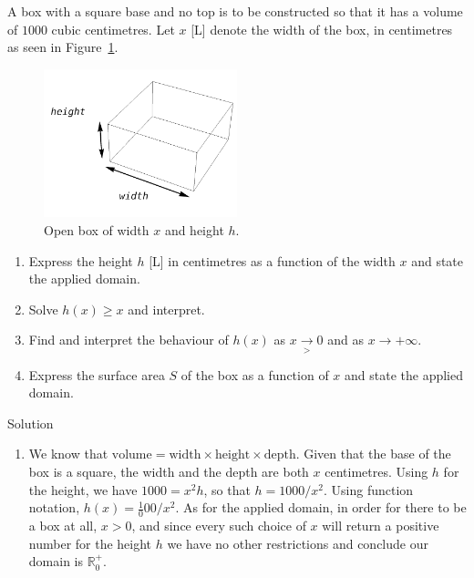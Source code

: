 \begin{example}  \label{boxnotopfixedvolume} 
A box with a square base and no top is to be constructed so that it has a volume of $1000$ cubic centimetres.  Let $x$ [L] denote the width of the box, in centimetres as seen in Figure~\ref{fig_algebraic_11}.

\begin{figure}[H]
	\begin{center}
			\includegraphics[width=0.5\textwidth]{fig_algebraic_11}
	\caption{Open box of width $x$ and height $h$.}
	\label{fig_algebraic_11}
	\end{center}
\end{figure}


\begin{enumerate}

\item  Express the height $h$ [L] in centimetres as a function of the width $x$ and state the applied domain.

\item  Solve $h(x) \geq x$ and interpret.

\item  Find and interpret the behaviour of $h(x)$ as $x \underset{>}{\rightarrow} 0$ and as $x \rightarrow +\infty$.

\item  Express the surface area $S$ of the box as a function of $x$ and state the applied domain.


\end{enumerate}

Solution 

\begin{enumerate}

\item  We know that $\mbox{volume} = \mbox{width} \times \mbox{height} \times \mbox{depth}$.  Given that the base of the box is a square, the width and the depth are both $x$ centimetres.  Using $h$ for the height, we have $1000 = x^2h$, so that $h = 1000/x^2$.  Using function notation, $h(x) = \frac1000/x^2$.  As for the applied domain, in order for there to be a box at all, $x > 0$, and since every such choice of $x$ will return a positive number for the height $h$ we have no other restrictions and  conclude our domain is $\mathbb{R}^+_0$.


\end{enumerate}
\end{example}

